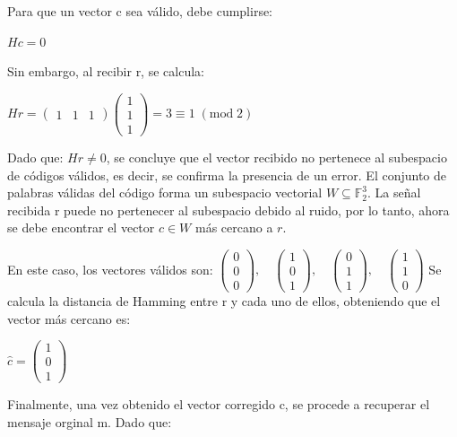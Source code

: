 \documentclass[letterpaper,12pt]{article}
\begin{document}
Para que un vector c sea válido, debe cumplirse:

\centerline{$Hc = 0$}

Sin embargo, al recibir r, se calcula:





\centerline{$Hr=\begin{pmatrix}1&1&1\end{pmatrix}\begin{pmatrix}1 \\ 1 \\ 1\end{pmatrix}=3\equiv 1\;(\mathrm{mod}\;2)$}

Dado que: $Hr\neq 0$, se concluye que el vector recibido no pertenece al subespacio de códigos válidos, es decir,
se confirma la presencia de un error.
\newpage
{}
El conjunto de palabras válidas del código forma un subespacio vectorial $W\subseteq\mathbb{F}_2^3$. La señal
recibida r puede no pertenecer al subespacio debido al ruido, por lo tanto, ahora se debe
encontrar el vector $c\in W$ más cercano a $r$.

En este caso, los vectores válidos son:
$\begin{pmatrix}0 \\ 0 \\ 0\end{pmatrix},\quad \begin{pmatrix}1 \\ 0 \\ 1\end{pmatrix},\quad \begin{pmatrix}0 \\ 1 \\ 1\end{pmatrix},\quad \begin{pmatrix}1 \\ 1 \\ 0\end{pmatrix}$
Se calcula la distancia de Hamming entre r y cada uno de ellos, obteniendo que el vector
más cercano es:

\centerline{$\hat{c}=\begin{pmatrix}1 \\ 0 \\ 1\end{pmatrix}$}


Finalmente, una vez obtenido el vector corregido c, se procede a recuperar el mensaje
orginal m. Dado que:
\end{document}
